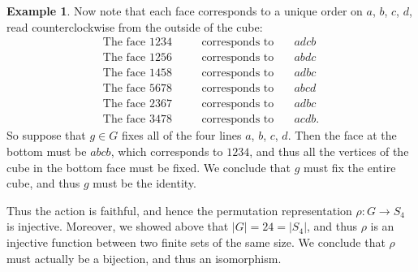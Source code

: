 \documentclass[12pt]{report}
\numberwithin{equation}{section}
\numberwithin{theorem}{chapter}
\theoremstyle{definition}
\newtheorem{example}[theorem]{Example}
\newtheorem*{basic properties}{Basic Properties}
\newtheorem*{Important Remark}{Important Remark}
\begin{document}
\begin{example}
Now note that each face corresponds to a unique order on $a$, $b$, $c$, $d$, read counterclockwise from the outside of the cube:
$$\begin{aligned}
	\text{The face } 1234 && \hspace{1em}\text{corresponds to} \hspace{1em} & adcb\\
	\text{The face } 1256 && \hspace{1em}\text{corresponds to} \hspace{1em} & abdc \\
	\text{The face } 1458 && \hspace{1em}\text{corresponds to} \hspace{1em} & adbc \\
	\text{The face } 5678 && \hspace{1em}\text{corresponds to} \hspace{1em} & abcd \\
	\text{The face } 2367 && \hspace{1em}\text{corresponds to} \hspace{1em} & adbc \\
	\text{The face } 3478 && \hspace{1em}\text{corresponds to} \hspace{1em} & acdb.	
\end{aligned}$$
So suppose that $g \in G$ fixes all of the four lines $a$, $b$, $c$, $d$. Then the face at the bottom must be $abcb$, which corresponds to $1234$, and thus all the vertices of the cube in the bottom face must be fixed. We conclude that $g$ must fix the entire cube, and thus $g$ must be the identity.



Thus the action is faithful, and hence the permutation representation $\rho\!: G\to S_4$ is injective. Moreover, we showed above that $|G|=24=|S_4|$, and thus $\rho$ is an injective function between two finite sets of the same size. We conclude that $\rho$ must actually be a bijection, and thus an isomorphism.



\end{example}
\end{document}
